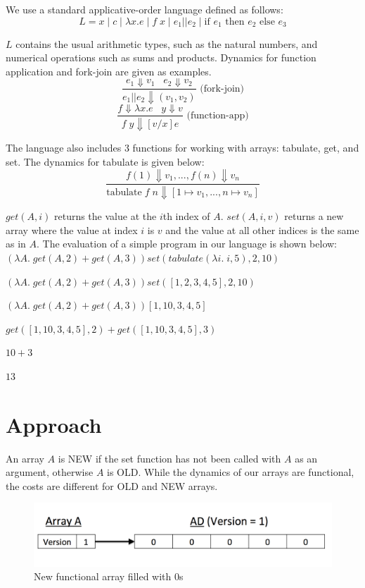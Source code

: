 \documentclass[preprint]{sigplanconf}
\begin{document}
We use a standard applicative-order language defined as follows:
$$L = x \; | \; c  \; | \; \lambda x.e \; | \; f \; x \; | \; e_1 || e_2 \; | \; \text{if } e_1 \text{ then } e_2 \text{ else } e_3$$

$L$ contains the usual arithmetic types, such as the natural numbers, and numerical operations such as sums and products. Dynamics for function application and fork-join are given as examples.
$$\frac{e_1 \Downarrow v_1 \;\;\; e_2 \Downarrow v_2}{e_1 || e_2 \Downarrow (v_1, v_2)} \text{ (fork-join)}$$
$$\frac{f \Downarrow \lambda x . e \;\;\; y \Downarrow v}{f \; y \Downarrow [v/x]e} \text{ (function-app)}$$

The language also includes 3 functions for working with arrays: tabulate, get, and set. The dynamics for tabulate is given below:
$$\frac{f(1) \Downarrow v_1, ..., f(n) \Downarrow v_n}{\text{tabulate} \; f \; n \Downarrow [1 \mapsto v_1, ..., n \mapsto v_n]}$$

$get(A,i)$ returns the value at the $i$th index of $A$. $set(A,i,v)$ returns a new array where the value at index $i$ is $v$ and the value at all other indices is the same as in $A$. The evaluation of a simple program in our language is shown below:\\

$(\lambda A. \; get(A, 2) + get(A,3)) set(tabulate(\lambda i . \; i, 5), 2, 10)$

$(\lambda A. \; get(A, 2) + get(A,3)) set([1,2,3,4,5], 2, 10)$

$(\lambda A. \; get(A, 2) + get(A,3)) [1,10,3,4,5]$

$get([1,10,3,4,5], 2) + get([1,10,3,4,5],3) $

$10+3$

$13$

\section{Approach}

An array $A$ is NEW if the set function has not been called with $A$ as an argument, otherwise $A$ is OLD. While the dynamics of our arrays are functional, the costs are different for OLD and NEW arrays. 

\begin{figure}[!ht]
\centering
\includegraphics[scale=0.3]{new_array_A}
\nocaptionrule \caption{New functional array filled with 0s}
\label{fig:new_array_A}
\end{figure}
\end{document}
